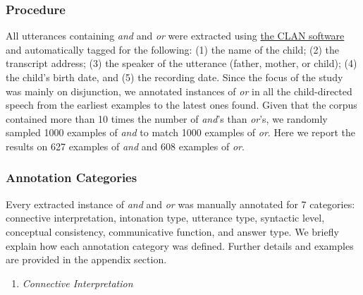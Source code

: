 \documentclass[,man,floatsintext]{apa6}
\providecommand{\tightlist}{%
  \setlength{\itemsep}{0pt}\setlength{\parskip}{0pt}}
\begin{document}
\hypertarget{procedure-1}{%
\subsubsection{Procedure}\label{procedure-1}}

All utterances containing \emph{and} and \emph{or} were extracted using \href{http://alpha.talkbank.org/clan/}{the CLAN software} and automatically tagged for the following: (1) the name of the child; (2) the transcript address; (3) the speaker of the utterance (father, mother, or child); (4) the child's birth date, and (5) the recording date. Since the focus of the study was mainly on disjunction, we annotated instances of \emph{or} in all the child-directed speech from the earliest examples to the latest ones found. Given that the corpus contained more than 10 times the number of \emph{and}'s than \emph{or}'s, we randomly sampled 1000 examples of \emph{and} to match 1000 examples of \emph{or}. Here we report the results on 627 examples of \emph{and} and 608 examples of \emph{or}.

\hypertarget{annotation-categories}{%
\subsubsection{Annotation Categories}\label{annotation-categories}}

Every extracted instance of \emph{and} and \emph{or} was manually annotated for 7 categories: connective interpretation, intonation type, utterance type, syntactic level, conceptual consistency, communicative function, and answer type. We briefly explain how each annotation category was defined. Further details and examples are provided in the appendix section.

\begin{enumerate}
\def\labelenumi{\arabic{enumi}.}
\tightlist
\item
  \emph{Connective Interpretation}
\end{enumerate}
\end{document}
